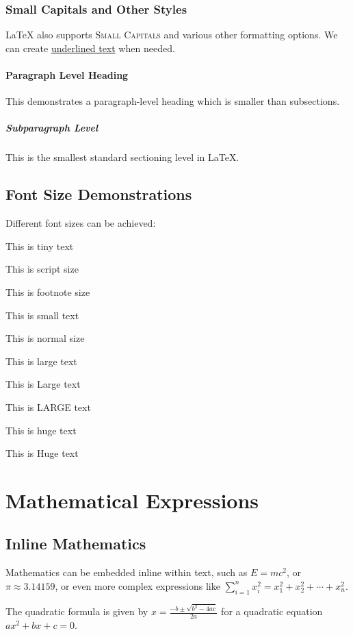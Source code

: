 \documentclass[11pt,letterpaper]{article}
\begin{document}
\subsubsection{Small Capitals and Other Styles}

LaTeX also supports \textsc{Small Capitals} and various other formatting options. We can create \underline{underlined text} when needed.

\paragraph{Paragraph Level Heading} This demonstrates a paragraph-level heading which is smaller than subsections.

\subparagraph{Subparagraph Level} This is the smallest standard sectioning level in LaTeX.

\subsection{Font Size Demonstrations}

Different font sizes can be achieved:

{\tiny This is tiny text}

{\scriptsize This is script size}

{\footnotesize This is footnote size}

{\small This is small text}

{\normalsize This is normal size}

{\large This is large text}

{\Large This is Large text}

{\LARGE This is LARGE text}

{\huge This is huge text}

{\Huge This is Huge text}

\section{Mathematical Expressions}

\subsection{Inline Mathematics}

Mathematics can be embedded inline within text, such as $E = mc^2$, or $\pi \approx 3.14159$, or even more complex expressions like $\sum_{i=1}^{n} x_i^2 = x_1^2 + x_2^2 + \cdots + x_n^2$.

The quadratic formula is given by $x = \frac{-b \pm \sqrt{b^2 - 4ac}}{2a}$ for a quadratic equation $ax^2 + bx + c = 0$.
\end{document}

